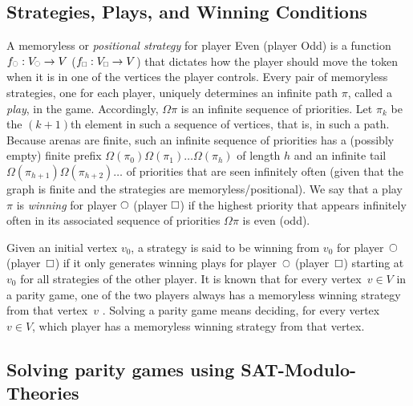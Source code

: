 \documentclass[runningheads]{llncs}
\begin{document}
\subsection*{Strategies, Plays, and Winning Conditions}
A memoryless or {\em positional strategy} for player Even (player Odd) is a function $f_{\subeven} : V_{\subeven} \to V$ ($f_{\subodd} : V_{\subodd} \to V$) that dictates how the player should move the token when it is in one of the vertices the player controls. Every pair of memoryless strategies, one for each player, uniquely determines an infinite path $\pi$, called a {\em play}, in the game. Accordingly, $\Omega \pi$ is an infinite sequence of priorities. Let $\pi_k$ be the $(k+1)$th element in such a sequence of vertices, that is, in such a path. Because arenas are finite, such an infinite sequence of priorities has a (possibly empty) finite prefix $\Omega(\pi_0) \Omega(\pi_1) \ldots \Omega(\pi_h)$ of length $h$ and an infinite tail $\Omega(\pi_{h+1}) \Omega(\pi_{h+2}) \ldots$ of priorities that are seen infinitely often (given that the graph is finite and the strategies are memoryless/positional). We say that a play~$\pi$ is {\em winning} for player $\even$ (player $\odd$) if the highest priority that appears infinitely often in its associated sequence of priorities $\Omega \pi$ is even (odd). 

Given an initial vertex $v_0$, a strategy is said to be winning from $v_0$ for player~$\even$ (player~$\odd$) if it only generates winning plays for player~$\even$ (player~$\odd$) starting at $v_0$ for all strategies of the other player. It is known that for every vertex~$v\in V$ in a parity game, one of the two players always has a memoryless winning strategy from that vertex~$v$ \cite{Zielonka:1998}. Solving a parity game means deciding, for every vertex~$v\in V$, which player has a memoryless winning strategy from that vertex.

\subsection{Solving parity games using SAT-Modulo-Theories}
\end{document}
